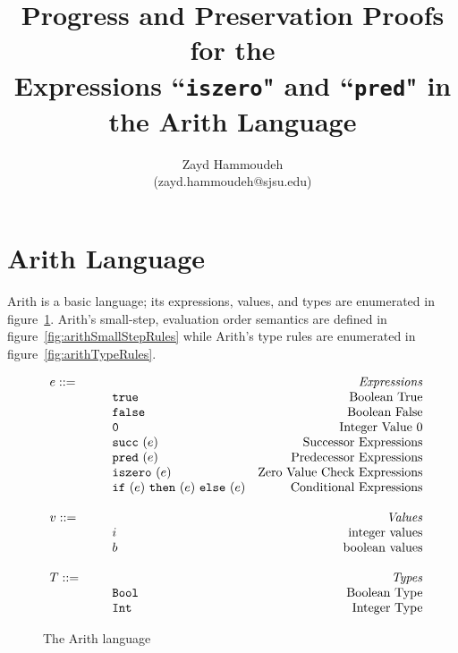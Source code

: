 \documentclass{report}
\title{Progress and Preservation Proofs for the \\
Expressions ``\texttt{iszero}" and ``\texttt{pred}" in the Arith Language}
\author{
  Zayd Hammoudeh \\
  (zayd.hammoudeh@sjsu.edu)
  }
\begin{document}
\maketitle


\tableofcontents{\protect\newpage}

\listoffigures
\newpage
 

\renewcommand\thesection{\arabic{section}}

\section{Arith Language}\label{sec:jvm}

Arith is a basic language; its expressions, values, and types are enumerated in figure~\ref{fig:arithLanguage}.  Arith's small-step, evaluation order semantics are defined in figure~\ref{fig:arithSmallStepRules} while Arith's type rules are enumerated in figure~\ref{fig:arithTypeRules}.

\newcommand{\mydefhead}[2]{\multicolumn{2}{l}{{#1}}&\mbox{\emph{#2}}\\}
\newcommand{\mydefcase}[2]{\qquad\qquad& #1 &\mbox{#2}\\}

\newcommand{\assign}[2]{#1~{:=}~#2}
\newcommand{\ife}[3]{\mbox{\tt if}~({#1})~\mbox{\tt then}~({#2})~\mbox{\tt else}~({#3})}
\newcommand{\iszeroe}[1]{\mbox{\tt iszero}~(#1)}
\newcommand{\prede}[1]{\mbox{\tt pred}~(#1)}
\newcommand{\succe}[1]{\mbox{\tt succ}~(#1)}
\newcommand{\true}{\mbox{\tt true}}
\newcommand{\false}{\mbox{\tt false}}
\newcommand{\zero}{\mbox{\tt 0}}
\newcommand{\boolt}{\mbox{\tt Bool}}
\newcommand{\intt}{\mbox{\tt Int}}

\begin{figure}[ht!]
\[
\begin{array}{llr}
  \mydefhead{e ::=\qquad\qquad\qquad\qquad}{Expressions}
  \mydefcase{\true}{Boolean True}
  \mydefcase{\false}{Boolean False}
  \mydefcase{\zero}{Integer Value 0}
  \mydefcase{\succe e}{Successor Expressions}
  \mydefcase{\prede e}{Predecessor Expressions}
  \mydefcase{\iszeroe e}{Zero Value Check Expressions}
  \mydefcase{\ife e e e}{Conditional Expressions}
  \\
  \mydefhead{v ::=\qquad\qquad\qquad\qquad}{Values}
  \mydefcase{i}{integer values}
  \mydefcase{b}{boolean values}
  \\
  \mydefhead{T ::=\qquad\qquad\qquad\qquad}{Types}
  \mydefcase{\boolt}{Boolean Type}
  \mydefcase{\intt}{Integer Type}
\end{array}
\]
\caption{The Arith language}\label{fig:arithLanguage}
\end{figure}
\end{document}
